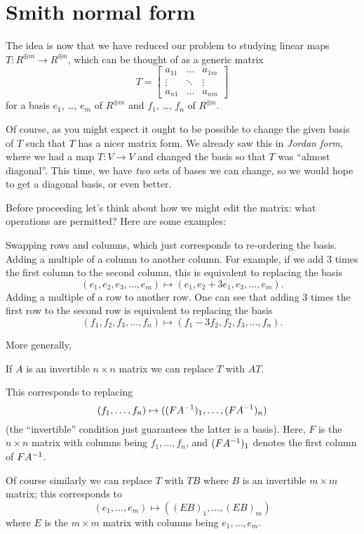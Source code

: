 \section{Smith normal form}
The idea is now that we have reduced our problem to studying
linear maps $T \colon R^{\oplus m} \to R^{\oplus n}$,
which can be thought of as a generic matrix
\[ T = \begin{bmatrix}
		a_{11} & \dots & a_{1m} \\
		\vdots & \ddots & \vdots \\
		a_{n1} & \dots & a_{nm}
	\end{bmatrix} \]
for a basis $e_1$, \dots, $e_m$ of $R^{\oplus m}$
and $f_1$, \dots, $f_n$ of $R^{\oplus n}$.

Of course, as you might expect it ought to be possible to change the
given basis of $T$ such that $T$ has a nicer matrix form.
We already saw this in \emph{Jordan form},
where we had a map $T \colon V \to V$ and changed the basis
so that $T$ was ``almost diagonal''.
This time, we have \emph{two} sets of bases we can change,
so we would hope to get a diagonal basis, or even better.

Before proceeding let's think about how we might edit the matrix:
what operations are permitted?  Here are some examples:
\begin{itemize}
	\ii Swapping rows and columns, which just corresponds
	to re-ordering the basis.
	\ii Adding a multiple of a column to another column.
	For example, if we add $3$ times the first column to the second column,
	this is equivalent to replacing the basis
	\[ (e_1, e_2, e_3, \dots, e_m) \mapsto (e_1, e_2+3e_1, e_3, \dots, e_m). \]
	\ii Adding a multiple of a row to another row.
	One can see that adding $3$ times the first row to the second row
	is equivalent to replacing the basis
	\[ (f_1, f_2, f_3, \dots, f_n) \mapsto (f_1-3f_2, f_2, f_3, \dots, f_n). \]
\end{itemize}
More generally,
\begin{moral}
	If $A$ is an invertible $n \times n$ matrix we can
	replace $T$ with $AT$.
\end{moral}
This corresponds to replacing
\[ (f_1, \dots, f_n) \mapsto ((F A^{-1})_1, \dots, (F A^{-1})_n) \]
(the ``invertible'' condition just guarantees the latter is a basis).
Here, $F$ is the $n \times n$ matrix with columns being $f_1, \dots, f_n$, and $(F A^{-1})_1$ denotes the
first column of $F A^{-1}$.

Of course similarly we can replace $T$ with $TB$
where $B$ is an invertible $m \times m$ matrix;
this corresponds to
\[ (e_1, \dots, e_m) \mapsto ((E B)_1, \dots, (E B)_m) \]
where $E$ is the $m \times m$ matrix with columns being $e_1, \dots, e_m$.

